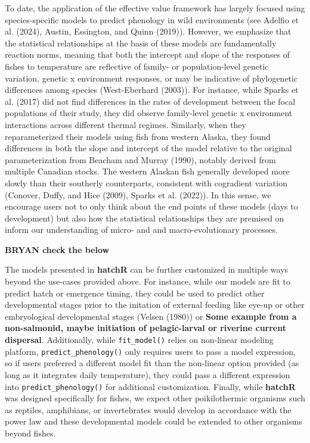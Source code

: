 \documentclass[webpdf,large,contemporary,namedate]{oup-authoring-template}
\theoremstyle{thmstyleone}
\theoremstyle{thmstyletwo}
\theoremstyle{thmstylethree}
\begin{document}
To date, the application of the effective value framework has largely
focused using species-specific models to predict phenology in wild
environments (see Adelfio et al. (2024), Austin, Essington, and Quinn
(2019)). However, we emphasize that the statistical relationships at the
basis of these models are fundamentally reaction norms, meaning that
both the intercept and slope of the responses of fishes to temperature
are reflective of family- or population-level genetic variation, genetic
x environment responses, or may be indicative of phylogenetic
differences among species (West-Eberhard (2003)). For instance, while
Sparks et al. (2017) did not find differences in the rates of
development between the focal populations of their study, they did
observe family-level genetic x environment interactions across different
thermal regimes. Similarly, when they reparameterized their models using
fish from western Alaska, they found differences in both the slope and
intercept of the model relative to the original parameterization from
Beacham and Murray (1990), notably derived from multiple Canadian
stocks. The western Alaskan fish generally developed more slowly than
their southerly counterparts, consistent with cogradient variation
(Conover, Duffy, and Hice (2009), Sparks et al. (2022)). In this sense,
we encourage users not to only think about the end points of these
models (days to development) but also how the statistical relationships
they are premised on inform our understanding of micro- and and
macro-evolutionary processes.

\textbf{BRYAN check the below}

The models presented in \textbf{hatchR} can be further customized in
multiple ways beyond the use-cases provided above. For instance, while
our models are fit to predict hatch or emergence timing, they could be
used to predict other developmental stages prior to the initation of
external feeding like eye-up or other embryological developmental stages
(Velsen (1980)) or \textbf{Some example from a non-salmonid, maybe
initiation of pelagic-larval or riverine current dispersal}.
Additionally, while \texttt{fit\_model()} relies on non-linear modeling
platform, \texttt{predict\_phenology()} only requires users to pass a
model expression, so if users preferred a different model fit than the
non-linear option provided (as long as it integrates daily temperature),
they could pass a different expression into
\texttt{predict\_phenology()} for additional customization. Finally,
while \textbf{hatchR} was designed specifically for fishes, we expect
other poikilothermic organisms such as reptiles, amphibians, or
invertebrates would develop in accordance with the power law and these
developmental models could be extended to other organisms beyond fishes.
\end{document}
